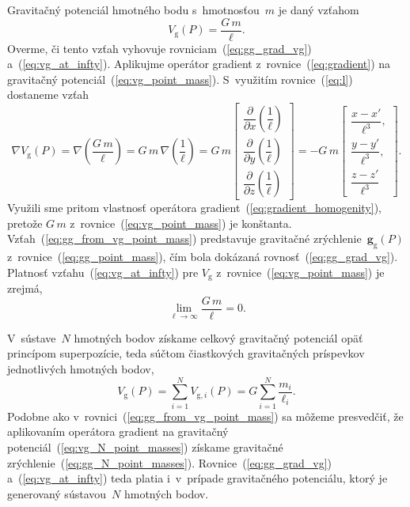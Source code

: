 \documentclass[a4paper, 12pt]{book}
\newcommand{\gidx}{\mathrm g}
\let\vec\mathbf
\begin{document}
Gravitačný potenciál hmotného bodu s~hmotnosťou~$m$ je daný vzťahom
%
\begin{equation}
\label{eq:vg_point_mass}
V_\gidx(P) = \frac{G \, m}{\ell}{.}
\end{equation}
%
Overme, či tento vzťah vyhovuje rovniciam~(\ref{eq:gg_grad_vg}) 
a~(\ref{eq:vg_at_infty}).  Aplikujme operátor gradient 
z~rovnice~(\ref{eq:gradient}) na gravitačný potenciál~(\ref{eq:vg_point_mass}).  
S~využitím rovnice~(\ref{eq:l}) dostaneme vzťah
%
\begin{equation}
\label{eq:gg_from_vg_point_mass}
\nabla V_\gidx(P) = \nabla \left( \frac{G \, m}{\ell} \right) = G \, m \, 
\nabla \left( \frac{1}{\ell} \right) =
%
G \, m
%
\begin{bmatrix}
\dfrac{\partial}{\partial x} \left( \dfrac{1}{\ell} \right)\\[2ex]
\dfrac{\partial}{\partial y} \left( \dfrac{1}{\ell} \right)\\[2ex]
\dfrac{\partial}{\partial z} \left( \dfrac{1}{\ell} \right)
\end{bmatrix}
%
=
%
-G \, m
%
\begin{bmatrix}
\dfrac{x - x'}{\ell^3}{,}\\[2ex]
\dfrac{y - y'}{\ell^3}{,}\\[2ex]
\dfrac{z - z'}{\ell^3}
\end{bmatrix}
{.}
\end{equation}
%
Využili sme pritom vlastnosť operátora gradient~(\ref{eq:gradient_homogenity}), 
pretože $G \, m$ z~rovnice~(\ref{eq:vg_point_mass}) je konštanta.  
Vzťah~(\ref{eq:gg_from_vg_point_mass}) predstavuje gravitačné zrýchlenie~$\vec 
g_\gidx(P)$ z~rovnice~(\ref{eq:gg_point_mass}), čím bola dokázaná 
rovnosť~(\ref{eq:gg_grad_vg}).  Platnosť vzťahu~(\ref{eq:vg_at_infty}) pre 
$V_\gidx$ z~rovnice~(\ref{eq:vg_point_mass}) je zrejmá,
%
\begin{equation}
\lim_{\ell \to \infty} \frac{G \, m}{\ell} = 0{.}
\end{equation}

V~sústave~$N$ hmotných bodov získame celkový gravitačný potenciál opäť 
princípom superpozície, teda súčtom čiastkových gravitačných príspevkov 
jednotlivých hmotných bodov,
%
\begin{equation}
\label{eq:vg_N_point_masses}
V_\gidx(P) = \sum_{i = 1}^{N} V_{\gidx,i}(P) = G \sum_{i = 1}^{N}\frac{
m_i}{\ell_i}{.}
\end{equation}
%
Podobne ako v~rovnici~(\ref{eq:gg_from_vg_point_mass}) sa môžeme presvedčiť, že 
aplikovaním operátora gradient na gravitačný 
potenciál~(\ref{eq:vg_N_point_masses}) získame gravitačné 
zrýchlenie~(\ref{eq:gg_N_point_masses}).  Rovnice~(\ref{eq:gg_grad_vg}) 
a~(\ref{eq:vg_at_infty}) teda platia i~v~prípade gravitačného potenciálu, ktorý 
je generovaný sústavou~$N$ hmotných bodov.
\end{document}
